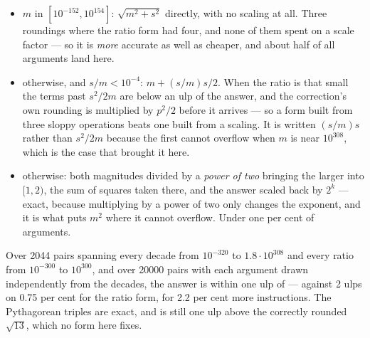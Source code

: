 \begin{description}[style=nextline,leftmargin=5.2em]
  \begin{itemize}
  \item $m$ in $[10^{-152}, 10^{154}]$: $\sqrt{m^2+s^2}$ directly, with no
    scaling at all. Three roundings where the ratio form had four, and none of
    them spent on a scale factor --- so it is \emph{more} accurate as well as
    cheaper, and about half of all arguments land here.
  \item otherwise, and $s/m < 10^{-4}$: $m + (s/m)s/2$. When the ratio is that
    small the terms past $s^2/2m$ are below an ulp of the answer, and the
    correction's own rounding is multiplied by $p^2/2$ before it arrives --- so a
    form built from three sloppy operations beats one built from a scaling. It is
    written $(s/m)s$ rather than $s^2/2m$ because the first cannot overflow when
    $m$ is near $10^{308}$, which is the case that brought it here.
  \item otherwise: both magnitudes divided by a \emph{power of two} bringing the
    larger into $[1,2)$, the sum of squares taken there, and the answer scaled
    back by $2^k$ --- exact, because multiplying by a power of two only changes
    the exponent, and it is what puts $m^2$ where it cannot overflow. Under one
    per cent of arguments.
  \end{itemize}

  Over \num{2044} pairs spanning every decade from $10^{-320}$ to
  $1.8\cdot10^{308}$ and every ratio from $10^{-300}$ to $10^{300}$, and over
  \num{20000} pairs with each argument drawn independently from the decades, the
  answer is within one ulp of  --- against 2 ulps on \num{0.75} per
  cent for the ratio form, for \num{2.2} per cent more instructions. The
  Pythagorean triples are exact, and  is still one ulp above
  the correctly rounded $\sqrt{13}$, which no form here fixes.


\end{description}
